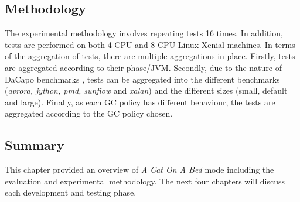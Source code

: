 \subsection{Methodology}
The experimental methodology involves repeating tests 16 times. In
addition, tests are performed on both 4-CPU and 8-CPU Linux Xenial
machines. In terms of the aggregation of tests, there are multiple
aggregations in place. Firstly, tests are aggregated according to their
phase/JVM. Secondly, due to the nature of DaCapo benchmarks
\cite{blackburn2006dacapo}, tests can be aggregated into the
different benchmarks (\emph{avrora, jython, pmd, sunflow} and \emph{xalan}) and the
different sizes (small, default and large). Finally, as each GC policy
has different behaviour, the tests are aggregated according to the GC
policy chosen.

\subsection{Summary}
This chapter provided an overview of \emph{A Cat On A Bed} mode including the evaluation and experimental methodology. The next four chapters will discuss each development and testing phase. 
